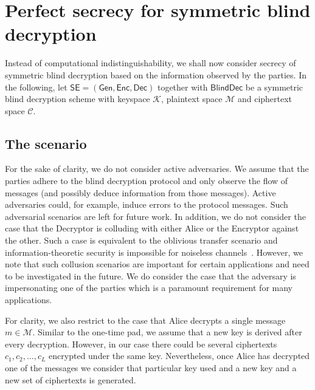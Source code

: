 \documentclass[10pt,journal]{IEEEtran}
\newcommand{\alg}[1]{\mathsf{#1}}
\newcommand{\sch}[1]{\mathsf{#1}}
\begin{document}
\section{Perfect secrecy for symmetric blind decryption}
\label{sec:Perfect secrecy for symmetric blind decryption}

Instead of computational indistinguishability, we shall now consider secrecy of
symmetric blind decryption based on the information observed by the parties.
In the following, let $\sch{SE} = (\alg{Gen},\alg{Enc},\alg{Dec})$ together with
$\alg{BlindDec}$ be a symmetric blind decryption
scheme with keyspace $\mathcal{K}$, plaintext space $\mathcal{M}$ and ciphertext space $\mathcal{C}$.

\subsection{The scenario}



For the sake of clarity, we do not consider active adversaries. We assume that the parties adhere to
the blind decryption protocol and only observe the flow of messages (and possibly deduce information from those messages).
Active adversaries could, for example, induce errors to the protocol messages.
Such adversarial scenarios are left for future work.
In addition, we do not consider the case that the Decryptor
is colluding with either Alice or the Encryptor
against the other.
Such a case is equivalent to the oblivious transfer scenario and information-theoretic security is impossible
for noiseless channels~\cite{Damgard_1999}.
However, we note that such collusion scenarios are important for certain applications and need to be investigated in the future.
We do consider the case that the adversary is impersonating one of the parties which is a paramount
requirement for many applications.

For clarity, we also restrict to the case that Alice decrypts a single message $m \in \mathcal{M}$. Similar to the one-time pad, we assume
that a new key is derived after every decryption.
However, in our case there could be several ciphertexts
$c_1,c_2,\ldots,c_L$ encrypted under the same key.
Nevertheless, once Alice has decrypted one of the messages
we consider that particular key used and a new key and a new set of ciphertexts is generated.
\end{document}
